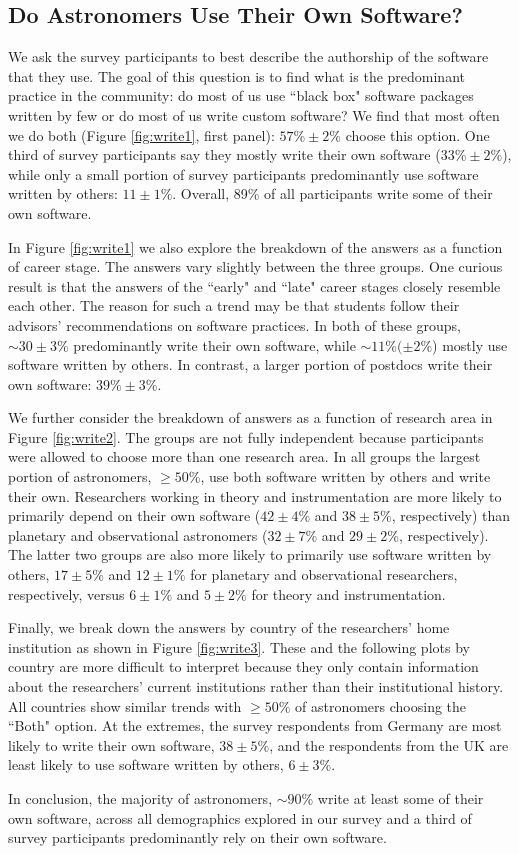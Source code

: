\subsection{Do Astronomers Use Their Own Software?}
\label{ssec:own}

We ask the survey participants to best describe the authorship of the software that they use. The goal of this question is to find what is the predominant practice in the community: do most of us use ``black box" software packages written by few or do most of us write custom software? We find that most often we do both (Figure \ref{fig:write1}, first panel): $57\%\pm2\%$ choose this option. One third of survey participants say they mostly write their own software ($33\%\pm2\%$), while only a small portion of survey participants predominantly use software written by others: $11\pm1\%$. Overall, 89\% of all participants write some of their own software.

In Figure \ref{fig:write1} we also explore the breakdown of the answers as a function of career stage. The answers vary slightly between the three groups. One curious result is that the answers of the ``early" and ``late" career stages closely resemble each other. The reason for such a trend may be that students follow their advisors' recommendations on software practices. In both of these groups, $\sim30\pm3\%$ predominantly write their own software, while $\sim11\%(\pm2\%$) mostly use software written by others. In contrast, a larger portion of postdocs write their own software: $39\%\pm3\%$. 

We further consider the breakdown of answers as a function of research area in Figure \ref{fig:write2}. The groups are not fully independent because participants were allowed to choose more than one research area. In all groups the largest portion of astronomers, $\ge50\%$, use both software written by others and write their own. Researchers working in theory and instrumentation are more likely to primarily depend on their own software ($42\pm4\%$ and $38\pm5\%$, respectively) than planetary and observational astronomers ($32\pm7\%$ and $29\pm2\%$, respectively). The latter two groups are also more likely to primarily use software written by others, $17\pm5\%$ and $12\pm1\%$ for planetary and observational researchers, respectively, versus $6\pm1\%$ and $5\pm2\%$ for theory and instrumentation.

Finally, we break down the answers by country of the researchers' home institution as shown in Figure \ref{fig:write3}. These and the following plots by country are more difficult to interpret because they only contain information about the researchers' current institutions rather than their institutional history. All countries show similar trends with $\ge50\%$ of astronomers choosing the ``Both" option. At the extremes, the survey respondents from Germany are most likely to write their own software, $38\pm5\%$, and the respondents from the UK are least likely to use software written by others, $6\pm3\%$.

In conclusion, the majority of astronomers, $\sim90\%$ write at least some of their own software, across all demographics explored in our survey and a third of survey participants predominantly rely on their own software.  
    
    
    
  
  
  
  
